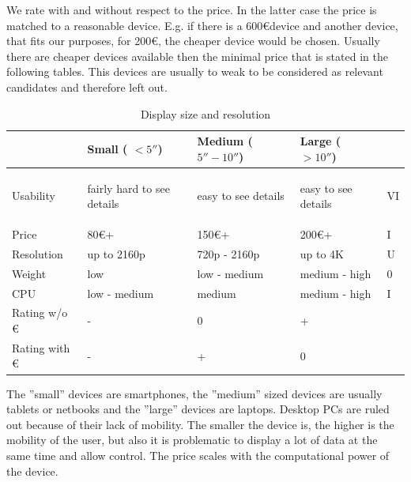 \documentclass[]{scrreprt}
\begin{document}
	We rate with and without respect to the price. In the latter case the price is matched to a reasonable device. E.g. if there is a 600\euro device and another device, that fits our purposes, for 200\euro, the cheaper device would be chosen. Usually there are cheaper devices available then the minimal price that is stated in the following tables. This devices are usually to weak to be considered as relevant candidates and therefore left out.

	\begin{table}[H]
		
		\centering
	\begin{tabular}{|l||l|l|l|l|}
		\hline 
		& Small ( $< 5''$) & Medium ( $5'' - 10''$) & Large ( $> 10''$) & \\ 
		\hline \hline
		Usability & \begin{pbox}{3.0cm}{\vspace{.2\baselineskip}fairly hard to see details\vspace{.3\baselineskip}}\end{pbox} & \begin{pbox}{2.0cm}{\vspace{.2\baselineskip}easy to see details\vspace{.3\baselineskip}}\end{pbox} & \begin{pbox}{2.0cm}{\vspace{.2\baselineskip}easy to see details\vspace{.3\baselineskip}}\end{pbox} & VI\\
		\hline 
		Price & $80$\euro+ & 150\euro+ & 200\euro+ & I \\  
		\hline 
		Resolution & up to 2160p & 720p - 2160p & up to 4K & U\\ 
		\hline 
		Weight & low & low - medium & medium - high & 0\\ 
		\hline
		CPU & low - medium & medium & medium - high & I \\
		\hline \hline
		Rating w/o \euro& - & 0 & +& \\
		\hline
		Rating with \euro& - & + & 0&\\
		\hline
	\end{tabular}
	\caption {Display size and resolution} \label{tab:DSAR}
	\end{table}

	The ''small'' devices are smartphones, the ''medium'' sized devices are usually tablets or netbooks and the ''large'' devices are laptops. Desktop PCs are ruled out because of their lack of mobility. The smaller the device is, the higher is the mobility of the user, but also it is problematic to display a lot of data at the same time and allow control. The price scales with the computational power of the device.
\end{document}
